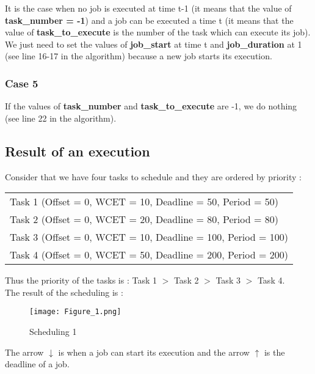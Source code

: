\documentclass[a4paper,12pt]{article}
\begin{document}
\smallskip
\noindent
It is the case when no job is executed at time t-1 (it means that the value of \textbf{task\_number = -1}) and a job can be executed a time t (it means that the value of \textbf{task\_to\_execute} is the number of the task which can execute its job). We just need to set the values of \textbf{job\_start} at time t and \textbf{job\_duration} at 1 (see line 16-17 in the algorithm) because a new job starts its execution.

\subsubsection{Case 5}
If the values of \textbf{task\_number} and \textbf{task\_to\_execute} are -1, we do nothing (see line 22 in the algorithm). 

\newpage
\subsection{Result of an execution}

Consider that we have four tasks to schedule and they are ordered by priority : \\

\smallskip
\begin{center}
\begin{tabular}{| l |}
\hline
Task 1 (Offset = 0, WCET = 10, Deadline = 50, Period = 50)\\
Task 2 (Offset = 0, WCET = 20, Deadline = 80, Period = 80)\\
Task 3 (Offset = 0, WCET = 10, Deadline = 100, Period = 100)\\
Task 4 (Offset = 0, WCET = 50, Deadline = 200, Period = 200)\\
\hline
\end{tabular}
\end{center}

\smallskip
\noindent
Thus the priority of the tasks is : Task 1 $>$ Task 2 $>$ Task 3 $>$ Task 4. \\

\noindent
The result of the scheduling is : \\

\begin{figure}[h!]
  \centering
  \texttt{[image: Figure\_1.png]}
  \caption{Scheduling 1}
  \label{fig: Scheduling 1}
\end{figure}
\noindent
The arrow $\downarrow$ is when a job can start its execution and the arrow $\uparrow$ is the deadline of a job. 
\end{document}
